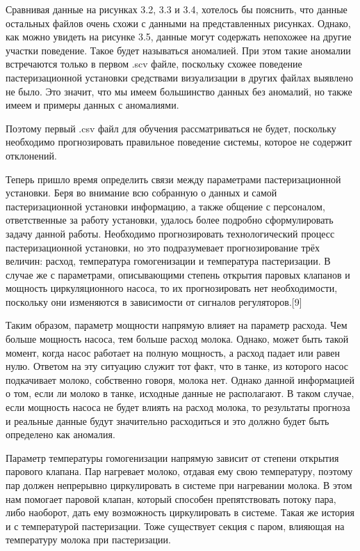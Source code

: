{  \par \redline Сравнивая данные на рисунках 3.2, 3.3 и 3.4, хотелось бы пояснить, что данные остальных файлов очень схожи с данными на представленных рисунках. Однако, как можно увидеть на рисунке 3.5, данные могут содержать непохожее на другие участки поведение. Такое будет называться аномалией. При этом такие аномалии встречаются только в первом .scv файле, поскольку схожее поведение пастеризационной установки средствами визуализации в других файлах выявлено не было. Это значит, что мы имеем большинство данных без аномалий, но также имеем и примеры данных с аномалиями. 

  \par \redline Поэтому первый .csv файл для обучения рассматриваться не будет, поскольку необходимо прогнозировать правильное поведение системы, которое не содержит отклонений. 

  \par \redline Теперь пришло время определить связи между параметрами пастеризационной установки. Беря во внимание всю собранную о данных и самой пастеризационной установки информацию, а также общение с персоналом, ответственные за работу установки, удалось более подробно сформулировать задачу данной работы. Необходимо прогнозировать технологический процесс пастеризационной установки, но это подразумевает прогнозирование трёх величин: расход, температура гомогенизации и температура пастеризации. В случае же с параметрами, описывающими степень открытия паровых клапанов и мощность циркуляционного насоса, то их прогнозировать нет необходимости, поскольку они изменяются в зависимости от сигналов регуляторов.[9] 

  \par \redline Таким образом, параметр мощности напрямую влияет на параметр расхода. Чем больше мощность насоса, тем больше расход молока. Однако, может быть такой момент, когда насос работает на полную мощность, а расход падает или равен нулю. Ответом на эту ситуацию служит тот факт, что в танке, из которого насос подкачивает молоко, собственно говоря, молока нет. Однако данной информацией о том, если ли молоко в танке, исходные данные не располагают. В таком случае, если мощность насоса не будет влиять на расход молока, то результаты прогноза и реальные данные будут значительно расходиться и это должно будет быть определено как аномалия. 

  \par \redline Параметр температуры гомогенизации напрямую зависит от степени открытия парового клапана. Пар нагревает молоко, отдавая ему свою температуру, поэтому пар должен непрерывно циркулировать в системе при нагревании молока. В этом нам помогает паровой клапан, который способен препятствовать потоку пара, либо наоборот, дать ему возможность циркулировать в системе. Такая же история и с температурой пастеризации. Тоже существует секция с паром, влияющая на температуру молока при пастеризации. 

}
